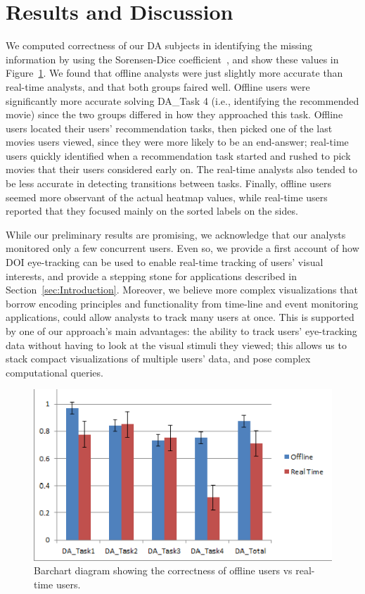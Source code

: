 ﻿\section{Results and Discussion}
We computed correctness of our DA subjects in identifying the missing information by using the Sorensen-Dice coefficient~\cite{sorensen1948method}, and show these values in Figure~\ref{fig:barchart}. We found that offline analysts were just slightly more accurate than real-time analysts, and that both groups faired well. Offline users were significantly more accurate solving DA\_Task 4 (i.e., identifying the recommended movie) since the two groups differed in how they approached this task. Offline users located their users' recommendation tasks, then picked one of the last movies users viewed, since they were more likely to be an end-answer; real-time users quickly identified when a recommendation task started and rushed to pick movies that their users considered early on. The real-time analysts also tended to be less accurate in detecting transitions between tasks. Finally, offline users seemed more observant of the actual heatmap values, while real-time users reported that they focused mainly on the sorted labels on the sides. 

While our preliminary results are promising, we acknowledge that our analysts monitored only a few concurrent users. Even so, we provide a first account of how DOI eye-tracking can be used to enable real-time tracking of users' visual interests, and provide a stepping stone for applications described in Section~\ref{sec:Introduction}.  Moreover, we believe more complex visualizations that borrow encoding principles and functionality from time-line and event monitoring applications, could allow analysts to track many users at once. This is supported by one of our approach's main advantages: the ability to track users' eye-tracking data without having to look at the visual stimuli they viewed; this allows us to stack compact visualizations of multiple users' data, and pose complex computational queries.  



\begin{figure}[htb]
  \centering
  \includegraphics[width=0.8\linewidth]{images/barchart.eps}%
  \caption{Barchart diagram showing the correctness of offline users vs real-time users.}
	\label{fig:barchart}
\end{figure} 

